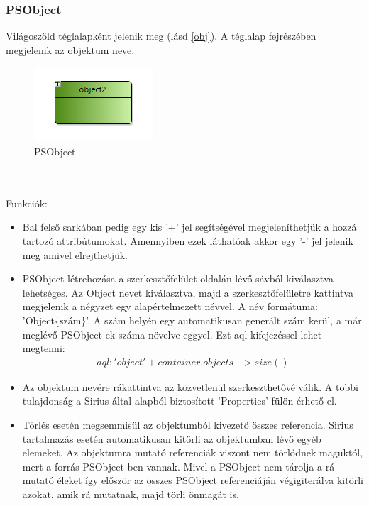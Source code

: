 \subsubsection{PSObject}
Világoszöld téglalapként jelenik meg (lásd \autoref{obj}).  A téglalap fejrészében megjelenik az objektum neve.
\begin{figure}[!ht]
	\centering
	\includegraphics{figures/obj.PNG}
	\caption{PSObject}
	\label{obj} 
\end{figure}
\\\\
Funkciók:
\begin{itemize}  	
	\item Bal felső sarkában pedig egy kis '+' jel segítségével megjeleníthetjük a hozzá tartozó attribútumokat. Amennyiben ezek láthatóak akkor egy '-' jel jelenik meg amivel elrejthetjük. 	
	
	\item PSObject létrehozása a szerkesztőfelület oldalán lévő sávból kiválasztva lehetséges. Az Object nevet kiválasztva, majd a szerkesztőfelületre kattintva megjelenik a négyzet egy alapértelmezett névvel. A név formátuma: 'Object\{szám\}'. A szám helyén egy automatikusan generált szám kerül, a már meglévő PSObject-ek száma növelve eggyel. Ezt aql kifejezéssel lehet megtenni: 
	\begin{align}
	aql:'object'+container.objects->size()
	\end{align}	

	\item Az objektum nevére rákattintva az közvetlenül szerkeszthetővé válik. A többi tulajdonság a Sirius által alapból biztosított 'Properties' fülön érhető el. 
	
	\item Törlés esetén megsemmisül az objektumból kivezető összes referencia. Sirius tartalmazás esetén automatikusan kitörli az objektumban lévő egyéb elemeket. Az objektumra mutató referenciák viszont nem törlődnek maguktól, mert a forrás PSObject-ben vannak. Mivel a PSObject nem tárolja a rá mutató éleket így először az összes PSObject referenciáján végigiterálva kitörli azokat, amik rá mutatnak, majd törli önmagát is. 
\end{itemize}


